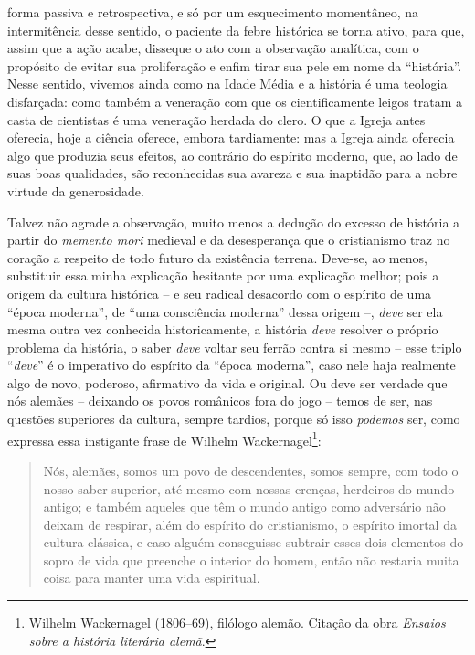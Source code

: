 forma passiva e retrospectiva, e só por um esquecimento momentâneo, na
intermitência desse sentido, o paciente da febre histórica se torna
ativo, para que, assim que a ação acabe, disseque o ato com a observação
analítica, com o propósito de evitar sua proliferação e enfim tirar sua
pele em nome da ``história''. Nesse sentido, vivemos ainda como na Idade
Média e a história é uma teologia disfarçada: como também a veneração
com que os cientificamente leigos tratam a casta de cientistas é uma
veneração herdada do clero. O que a Igreja antes oferecia, hoje a ciência
oferece, embora tardiamente: mas a Igreja ainda oferecia algo que
produzia seus efeitos, ao contrário do espírito moderno, que, ao lado de
suas boas qualidades, são reconhecidas sua avareza e sua inaptidão para
a nobre virtude da generosidade.

Talvez não agrade a observação, muito menos a dedução do excesso de
história a partir do \emph{memento mori} medieval e da desesperança que
o cristianismo traz no coração a respeito de todo futuro da existência
terrena. Deve-se, ao menos, substituir essa minha explicação hesitante
por uma explicação melhor; pois a origem da cultura histórica -- e seu
radical desacordo com o espírito de uma ``época moderna'', de ``uma
consciência moderna'' dessa origem --, \emph{deve} ser ela mesma outra vez
conhecida historicamente, a história \emph{deve} resolver o próprio
problema da história, o saber \emph{deve} voltar seu ferrão contra si
mesmo -- esse triplo ``\emph{deve}'' é o imperativo do espírito da
``época moderna'', caso nele haja realmente algo de novo, poderoso,
afirmativo da vida e original. Ou deve ser verdade que nós alemães --
deixando os povos românicos fora do jogo -- temos de ser, nas questões
superiores da cultura, sempre tardios, porque só isso \emph{podemos}
ser, como expressa essa instigante frase de Wilhelm
Wackernagel\footnote{Wilhelm Wackernagel (1806--69), filólogo alemão.
  Citação da obra \emph{Ensaios sobre a história literária alemã}.}:

\begin{quote}
Nós, alemães, somos um povo de descendentes, somos sempre, com todo o
nosso saber superior, até mesmo com nossas crenças, herdeiros do mundo
antigo; e também aqueles que têm o mundo antigo como adversário não
deixam de respirar, além do espírito do cristianismo, o espírito imortal
da cultura clássica, e caso alguém conseguisse subtrair esses dois
elementos do sopro de vida que preenche o interior do homem, então não
restaria muita coisa para manter uma vida espiritual. 
\end{quote}

